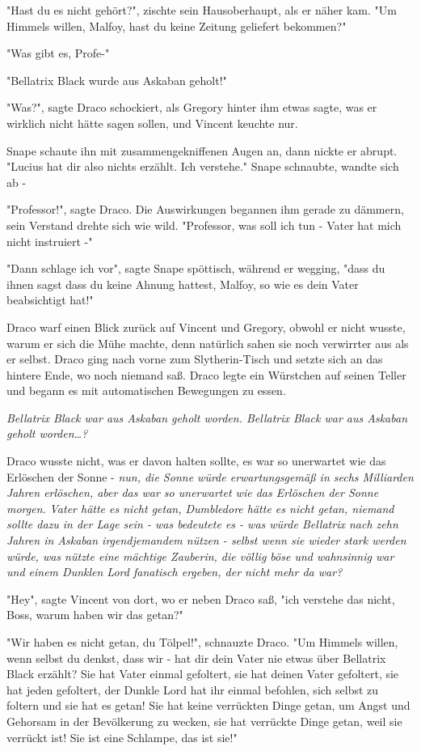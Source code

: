 {"Hast du es nicht gehört?", zischte sein Hausoberhaupt, als er näher kam. "Um Himmels willen, Malfoy, hast du keine Zeitung geliefert bekommen?"

"Was gibt es, Profe-"

"Bellatrix Black wurde aus Askaban geholt!"

"Was?", sagte Draco schockiert, als Gregory hinter ihm etwas sagte, was er wirklich nicht hätte sagen sollen, und Vincent keuchte nur.

Snape schaute ihn mit zusammengekniffenen Augen an, dann nickte er abrupt. "Lucius hat dir also nichts erzählt. Ich verstehe." Snape schnaubte, wandte sich ab -

"Professor!", sagte Draco. Die Auswirkungen begannen ihm gerade zu dämmern, sein Verstand drehte sich wie wild. "Professor, was soll ich tun - Vater hat mich nicht instruiert -"

"Dann schlage ich vor", sagte Snape spöttisch, während er wegging, "dass du ihnen sagst dass du keine Ahnung hattest, Malfoy, so wie es dein Vater beabsichtigt hat!"

Draco warf einen Blick zurück auf Vincent und Gregory, obwohl er nicht wusste, warum er sich die Mühe machte, denn natürlich sahen sie noch verwirrter aus als er selbst. Draco ging nach vorne zum Slytherin-Tisch und setzte sich an das hintere Ende, wo noch niemand saß. Draco legte ein Würstchen auf seinen Teller und begann es mit automatischen Bewegungen zu essen.

\emph{Bellatrix Black war aus Askaban geholt worden. Bellatrix Black war aus Askaban geholt worden…?}

Draco wusste nicht, was er davon halten sollte, es war so unerwartet wie das Erlöschen der Sonne - \emph{nun, die Sonne würde erwartungsgemäß in sechs Milliarden Jahren erlöschen, aber das war so unerwartet wie das Erlöschen der Sonne morgen.} \emph{Vater hätte es nicht getan, Dumbledore hätte es nicht getan, niemand sollte dazu in der Lage sein - was bedeutete es - was würde Bellatrix nach zehn Jahren in Askaban irgendjemandem nützen - selbst wenn sie wieder stark werden würde, was nützte eine mächtige Zauberin, die völlig böse und wahnsinnig war und einem Dunklen Lord fanatisch ergeben, der nicht mehr da war?}

"Hey", sagte Vincent von dort, wo er neben Draco saß, "ich verstehe das nicht, Boss, warum haben wir das getan?"

"Wir haben es nicht getan, du Tölpel!", schnauzte Draco. "Um Himmels willen, wenn selbst du denkst, dass wir - hat dir dein Vater nie etwas über Bellatrix Black erzählt? Sie hat Vater einmal gefoltert, sie hat deinen Vater gefoltert, sie hat jeden gefoltert, der Dunkle Lord hat ihr einmal befohlen, sich selbst zu foltern und sie hat es getan! Sie hat keine verrückten Dinge getan, um Angst und Gehorsam in der Bevölkerung zu wecken, sie hat verrückte Dinge getan, weil sie verrückt ist! Sie ist eine Schlampe, das ist sie!"

}
